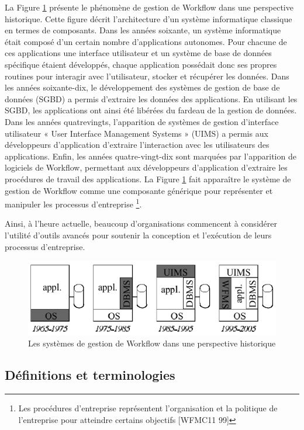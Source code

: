 	  La Figure \ref{fig:wfmchistory} présente le phénomène de gestion de Workflow dans une perspective historique. Cette figure décrit l’architecture d’un système informatique classique en termes de composants. Dans les années soixante, un système informatique était composé d’un certain nombre d’applications autonomes. Pour chacune de ces applications une interface utilisateur et un système de base de données spécifique étaient développés, chaque application possédait donc ses propres routines pour interagir avec l’utilisateur, stocker et récupérer les données. Dans les années soixante-dix, le développement des systèmes de gestion de base de données (SGBD) a permis d’extraire les données des applications. En utilisant les SGBD, les applications ont ainsi été libérées du fardeau de la gestion de données. Dans les années quatrevingts, l’apparition de systèmes de gestion d’interface utilisateur « User Interface Management Systems » (UIMS) a permis aux développeurs d’application d’extraire l’interaction avec les utilisateurs des applications. Enfin, les années quatre-vingt-dix sont marquées par l’apparition de logiciels de Workflow, permettant aux développeurs d’application d’extraire les procédures de travail des applications. La Figure \ref{fig:wfmchistory} fait apparaître le système de gestion de Workflow comme une composante générique pour représenter et manipuler les processus d’entreprise \footnote{\samepage Les procédures d’entreprise représentent l’organisation et la politique de l’entreprise pour atteindre certains objectifs [WFMC11 99] }. 
 	  
 	  Ainsi, à l’heure actuelle, beaucoup d’organisations commencent à considérer l’utilité d’outils avancés pour soutenir la conception et l’exécution de leurs processus d’entreprise.
 	 
 	 
 	 
\begin{figure}[h]
	\centering
	\includegraphics[width=0.7\linewidth]{images/wfmcHistory}
	\caption{Les systèmes de gestion de Workflow dans une perspective historique }
	\label{fig:wfmchistory}
\end{figure}
 	 
 	 
 	 \subsection{Définitions et terminologies }
 	 
